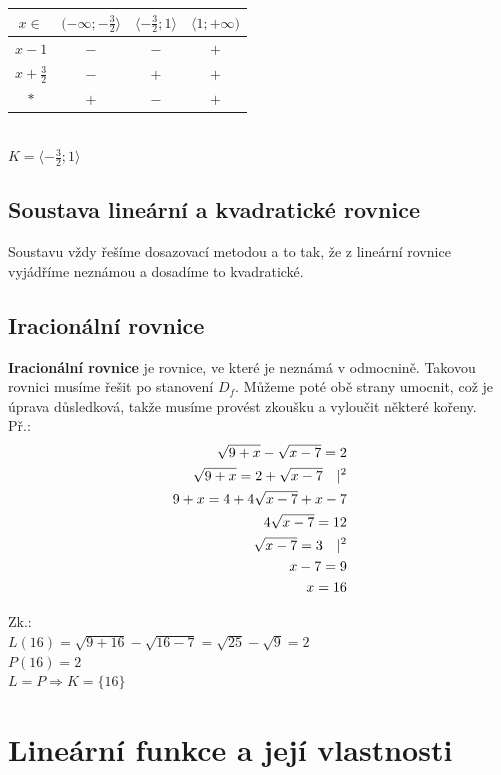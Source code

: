\documentclass[12pt, a4paper]{article}
\newcommand{\imply}{\Rightarrow}
\begin{document}
\begin{center}
\begin{tabular}{| c | c | c | c |}
\hline
$x \in$ & $(-\infty;-\frac{3}{2} \rangle$ & $\langle -\frac{3}{2};1 \rangle$ & $\langle 1; +\infty)$\\
\hline
$x-1$ & $-$ & $-$ & $+$\\
\hline
$x+\frac{3}{2}$ & $-$ & $+$ & $+$\\
\hline
$*$ & $+$ & $-$ & $+$\\
\hline
\end{tabular}\\
$K = \langle -\frac{3}{2};1 \rangle$\\
\end{center}

\subsection*{Soustava lineární a kvadratické rovnice}
Soustavu vždy řešíme dosazovací metodou a to tak, že z lineární rovnice vyjádříme neznámou a dosadíme to kvadratické.

\subsection*{Iracionální rovnice}
\textbf{Iracionální rovnice} je rovnice, ve které je neznámá v odmocnině. Takovou rovnici musíme řešit po stanovení $D_f$. Můžeme poté obě strany umocnit, což je úprava důsledková,
takže musíme provést zkoušku a vyloučit některé kořeny.\\
Př.:\\
\[
\begin{aligned}
\sqrt{9+x}-\sqrt{x-7}=2\\
\sqrt{9+x}=2+\sqrt{x-7} \text{\quad} |^2\\
9+x = 4 + 4\sqrt{x-7} + x - 7\\
4\sqrt{x-7} = 12\\
\sqrt{x-7} = 3 \text{\quad} |^2\\
x-7 = 9\\
x=16
\end{aligned}
\]

Zk.:\\
$ L(16)=\sqrt{9+16} - \sqrt{16-7}=\sqrt{25}-\sqrt{9}=2$\\
$P(16)=2$\\
$L = P \imply K=\{ 16 \}$

\section{Lineární funkce a její vlastnosti}
\end{document}

